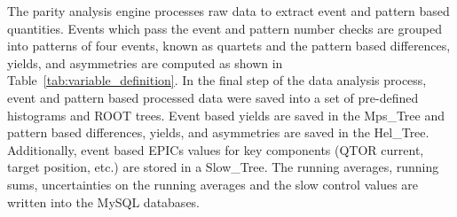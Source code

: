 The parity analysis engine processes raw data to extract event and pattern based quantities. Events which pass the event and pattern number checks are grouped into patterns of four events, known as quartets and the pattern based differences, yields, and asymmetries are computed as shown in Table~\ref{tab:variable_definition}. 
In the final step of the data analysis process, event and pattern based processed data were saved into a set of pre-defined histograms and ROOT trees. Event based yields are saved in the Mps\_Tree and pattern based differences, yields, and asymmetries are saved in the Hel\_Tree. Additionally, event based EPICs values for key components (QTOR current, target position, etc.) are stored in a Slow\_Tree. The running averages, running sums, uncertainties on the running averages and the slow control values are written into the MySQL databases.


